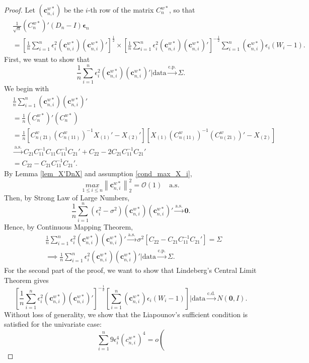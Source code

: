 \documentclass[12pt]{article}
\newcommand{\ep}{\bm{\epsilon}} %
\newcommand{\sumin}{\sum_{i=1}^n} %
\newcommand{\dn}{\frac{1}{n}} %
\newcommand{\dqn}{\frac{1}{\sqrt{n}}} %
\newcommand{\CONV}[1]{\stackrel{\text{#1}}{\longrightarrow}} %
\newcommand{\cnwa}{C_{n(11)}^w}
\newcommand{\cnwc}{C_{n(21)}^w}
\newcommand{\cnwsi}{\left(\bm{c}_{n,i}^{w*}\right)} %
\begin{document}
\begin{proof}
	Let $\cnwsi$ be the $i$-th row of the matrix $C_n^{w*}$, so that
	\begin{align*}
		&\dqn \left( C_n^{w*} \right)' (D_n - I) \ep_n \\ 
		&= \left[
	  			\dn \sumin \epsilon_i^2 \cnwsi \cnwsi' 
	  	  \right]^{\frac{1}{2}}
	  	  \times
	  	  \left[
	  			\dn \sumin \epsilon_i^2 \cnwsi \cnwsi'
	  	  \right]^{-\frac{1}{2}}
	   	  \sumin \cnwsi \epsilon_i (W_i - 1).
	\end{align*}
	First, we want to show that 
	$$
	\dn \sumin \epsilon_i^2 \cnwsi \cnwsi'
	\bigg| \text{data}
	\CONV{c.p.} \Sigma.
	$$
	We begin with 
	\begin{align*}
		&\dn \sumin \cnwsi \cnwsi' \\
		&= \dn \left( C_n^{w*} \right)' \left( C_n^{w*} \right) \\ 
		&= \dn
			\left[
				\cnwc \left( \cnwa \right)^{-1} X_{(1)}' - X_{(2)}'
			\right] 
			\left[
				X_{(1)} \left( \cnwa \right)^{-1} \left( \cnwc \right)'  - X_{(2)}
			\right] \\
		&\CONV{a.s.} C_{21} C_{11}^{-1} C_{11} C_{11}^{-1} C_{21}'
					+ C_{22}  - 2 C_{21} C_{11}^{-1} C_{21}' \\
		&= C_{22} - C_{21} C_{11}^{-1} C_{21}'. 
	\end{align*}
	By Lemma \ref{lem_X'DnX} and assumption \eqref{cond_max_X_i},
	$$
	\underset{1 \leq i \leq n}{max} \left\| \bm{c}_{n,i}^{w*} \right\|^2_2
	= \mathcal{O}(1) \quad \text{a.s.}
	$$
	Then, by Strong Law of Large Numbers,
	$$
	\dn \sumin \left( \epsilon_i^2 - \sigma^2 \right) \cnwsi \cnwsi' 
	\CONV{a.s.} \bm{0}.
	$$
	Hence, by Continuous Mapping Theorem,
	\begin{align*}
		&\dn \sumin \epsilon_i^2 \cnwsi \cnwsi'
			\CONV{a.s.} \sigma^2 
			\left[ 
				C_{22} - C_{21} C_{11}^{-1} C_{21}' 
			\right] 
			= \Sigma \\
		&\implies \dn \sumin \epsilon_i^2 \cnwsi \cnwsi'
			\bigg| \text{data} \CONV{c.p.} \Sigma.  
	\end{align*}
	For the second part of the proof, we want to show that Lindeberg's Central Limit Theorem gives 
	$$
	\left[
		\dn \sumin \epsilon_i^2 \cnwsi \cnwsi'
	\right]^{-\frac{1}{2}}
	\left[
		\sumin \cnwsi \epsilon_i (W_i - 1)
	\right]
	\bigg| \text{data}
	\CONV{c.d.}
	N \left(\bm{0}, I \right).
	$$
	Without loss of generality, we show that the Liapounov's sufficient condition is satisfied for the univariate case:
	$$
	\sumin 9 \epsilon_i^4 \left( c_{n,i}^{w*} \right)^4
	= o \left(
$$
\end{proof}
\end{document}
